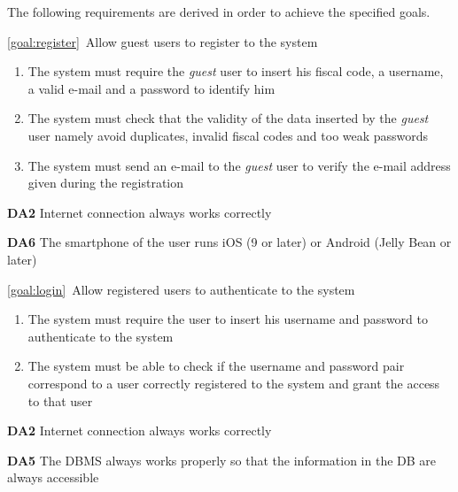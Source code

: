 	The following requirements are derived in order to achieve the specified goals.
	\begin{description}
		\item \ref{goal:register}\ Allow guest users to register to the system
			\begin{enumerate}[label=\textbf{R\arabic*}]
			
  				\item The system must require the \emph{guest} user to insert his fiscal code, a username, a valid e-mail and a password to identify him
  				
   				\item The system must check that the validity of the data inserted by the \emph{guest} user namely avoid duplicates, invalid fiscal codes and too weak passwords
   				
   				\item The system must send an e-mail to the \emph{guest} user to verify the e-mail address given during the registration
   
  			\end{enumerate}
  				
				\textbf{DA2} Internet connection always works correctly
				
				\textbf{DA6} The smartphone of the user runs iOS (9 or later) or Android (Jelly Bean or later)
			
  			
		\item \ref{goal:login}\ Allow registered users to authenticate to the system
			\begin{enumerate}[label=\textbf{R\arabic*}, resume]
  				\item The system must require the user to insert his username and password to authenticate to the system
   				\item The system must be able to check if the username and password pair correspond to a user correctly registered to the system and grant the access to that user

			\end{enumerate}
			
			\textbf{DA2} Internet connection always works correctly
			
			\textbf{DA5} The DBMS always works properly so that the information in the DB are always accessible
			

\end{description}
